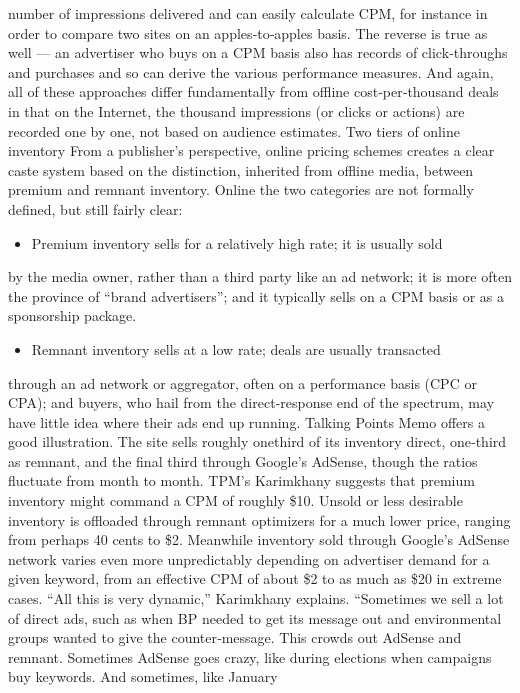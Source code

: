 number of impressions delivered and can easily calculate CPM, for
instance in order to compare two sites on an apples‐to‐apples basis. The
reverse is true as well — an advertiser who buys on a CPM basis also has
records of click‐throughs and purchases and so can derive the various
performance measures. And again, all of these approaches differ
fundamentally from offline cost‐per‐thousand deals in that on the
Internet, the thousand impressions (or clicks or actions) are recorded one
by one, not based on audience estimates.
Two tiers of online inventory
From a publisher’s perspective, online pricing schemes creates a clear
caste system based on the distinction, inherited from offline media,
between premium and remnant inventory. Online the two categories are
not formally defined, but still fairly clear:
\begin{itemize}
\item Premium inventory sells for a relatively high rate; it is usually sold
\end{itemize}
by the media owner, rather than a third party like an ad network; it
is more often the province of ``brand advertisers''; and it typically
sells on a CPM basis or as a sponsorship package.
\begin{itemize}
\item Remnant inventory sells at a low rate; deals are usually transacted
\end{itemize}
through an ad network or aggregator, often on a performance basis
(CPC or CPA); and buyers, who hail from the direct‐response end
of the spectrum, may have little idea where their ads end up
running.
Talking Points Memo offers a good illustration. The site sells roughly onethird
of its inventory direct, one‐third as remnant, and the final third
through Google’s AdSense, though the ratios fluctuate from month to
month. TPM’s Karimkhany suggests that premium inventory might
command a CPM of roughly \$10. Unsold or less desirable inventory is
offloaded through remnant optimizers for a much lower price, ranging
from perhaps 40 cents to \$2. Meanwhile inventory sold through Google’s
AdSense network varies even more unpredictably depending on
advertiser demand for a given keyword, from an effective CPM of about
\$2 to as much as \$20 in extreme cases.
``All this is very dynamic,'' Karimkhany explains. ``Sometimes we sell a lot
of direct ads, such as when BP needed to get its message out and
environmental groups wanted to give the counter‐message. This crowds
out AdSense and remnant. Sometimes AdSense goes crazy, like during
elections when campaigns buy keywords. And sometimes, like January
